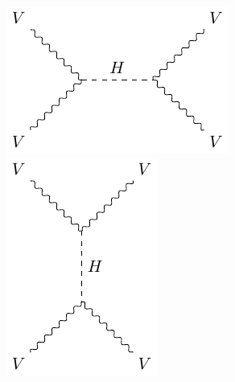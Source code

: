 \begin{figure}[!ht]
\begin{minipage}{0.18\textwidth}
  \end{minipage}%
  \begin{minipage}{0.23\textwidth}
    \includegraphics[width=\textwidth]{figures/feyn_vbs_3.pdf}
  \end{minipage}%
  \begin{minipage}{0.18\textwidth}
    \includegraphics[width=\textwidth]{figures/feyn_vbs_5.pdf}

\end{minipage}
\end{figure}
